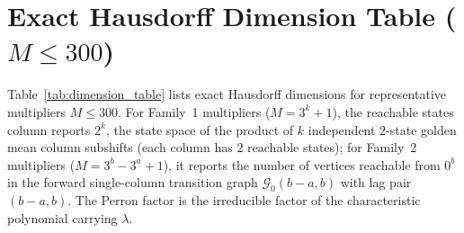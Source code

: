 \documentclass[11pt,reqno]{amsart}
\theoremstyle{plain}
\theoremstyle{definition}
\theoremstyle{remark}
\begin{document}
\section{Exact Hausdorff Dimension Table (\texorpdfstring{$M \le 300$}{M <= 300})}\label{sec:table}

Table~\ref{tab:dimension_table} lists exact Hausdorff dimensions for representative multipliers $M \le 300$. For Family~1 multipliers ($M = 3^k + 1$), the reachable states column reports $2^k$, the state space of the product of $k$ independent $2$-state golden mean column subshifts (each column has $2$ reachable states); for Family~2 multipliers ($M = 3^b - 3^a + 1$), it reports the number of vertices reachable from $0^b$ in the forward single-column transition graph $\mathcal{G}_0(b-a, b)$ with lag pair $(b-a, b)$. The Perron factor is the irreducible factor of the characteristic polynomial carrying $\lambda$.
\end{document}
